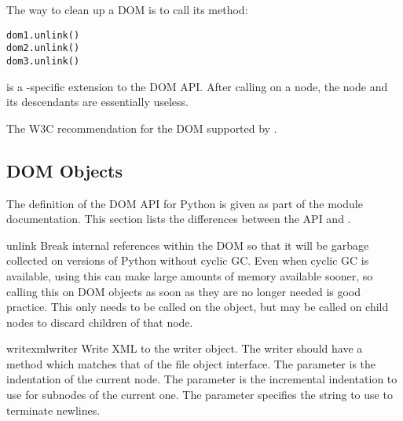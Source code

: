 The way to clean up a DOM is to call its  method:

\begin{verbatim}
dom1.unlink()
dom2.unlink()
dom3.unlink()
\end{verbatim}

 is a -specific extension to
the DOM API.  After calling  on a node, the node and
its descendants are essentially useless.

\begin{seealso}
           {The W3C recommendation for the
            DOM supported by .}
\end{seealso}


\subsection{DOM Objects \label{dom-objects}}

The definition of the DOM API for Python is given as part of the
 module documentation.  This section lists the
differences between the API and .


\begin{methoddesc}[Node]{unlink}{}
Break internal references within the DOM so that it will be garbage
collected on versions of Python without cyclic GC.  Even when cyclic
GC is available, using this can make large amounts of memory available
sooner, so calling this on DOM objects as soon as they are no longer
needed is good practice.  This only needs to be called on the
 object, but may be called on child nodes to discard
children of that node.
\end{methoddesc}

\begin{methoddesc}[Node]{writexml}{writer}
Write XML to the writer object.  The writer should have a
 method which matches that of the file object
interface.  The  parameter is the indentation of the current
node.  The  parameter is the incremental indentation to use
for subnodes of the current one.  The  parameter specifies the
string to use to terminate newlines.


\end{methoddesc}


